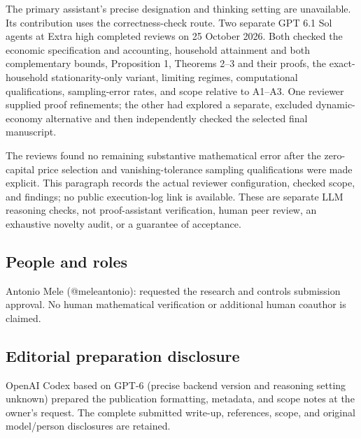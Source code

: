 \documentclass{article}
\begin{document}
The primary assistant's precise designation and thinking setting are unavailable. Its contribution uses the correctness-check route. Two separate GPT 6.1 Sol agents at Extra high completed reviews on 25 October 2026. Both checked the economic specification and accounting, household attainment and both complementary bounds, Proposition 1, Theorems 2--3 and their proofs, the exact-household stationarity-only variant, limiting regimes, computational qualifications, sampling-error rates, and scope relative to A1--A3. One reviewer supplied proof refinements; the other had explored a separate, excluded dynamic-economy alternative and then independently checked the selected final manuscript.

The reviews found no remaining substantive mathematical error after the zero-capital price selection and vanishing-tolerance sampling qualifications were made explicit. This paragraph records the actual reviewer configuration, checked scope, and findings; no public execution-log link is available. These are separate LLM reasoning checks, not proof-assistant verification, human peer review, an exhaustive novelty audit, or a guarantee of acceptance.

\subsection{People and roles}

Antonio Mele (@meleantonio): requested the research and controls submission approval. No human mathematical verification or additional human coauthor is claimed.

\subsection{Editorial preparation disclosure}

OpenAI Codex based on GPT-6 (precise backend version and reasoning setting unknown) prepared the publication formatting, metadata, and scope notes at the owner's request. The complete submitted write-up, references, scope, and original model/person disclosures are retained.
\end{document}
